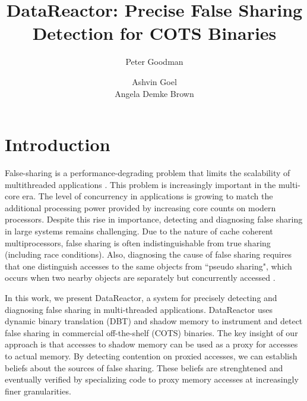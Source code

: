 \documentclass{sig-alternate}
\newcommand{\Toolname}{DataReactor}
\begin{document}
\title{\Large \bf \Toolname: Precise False Sharing Detection for COTS Binaries}
\author{
\alignauthor
Peter Goodman\\
\and
\alignauthor
Ashvin Goel\\
\alignauthor
Angela Demke Brown\\
}
\maketitle


\section{Introduction}\label{sec:intro}


False-sharing is a performance-degrading problem that limits the scalability of multithreaded applications
\cite{ImpactOfFalseSharing}. This problem is increasingly important in the multi-core era. The level of
concurrency in applications is growing to match the additional processing power provided by increasing
core counts on modern processors. Despite this rise in importance, detecting and diagnosing false
sharing in large systems remains challenging. Due to the nature of cache coherent multiprocessors, false
sharing is often indistinguishable from true sharing (including race conditions). Also, diagnosing the cause
of false sharing requires that one distinguish accesses to the same objects from ``pseudo sharing", which
occurs when two nearby objects are separately but concurrently accessed \cite{DegenerateSharingAndFalseCoherence}.

In this work, we present \Toolname{}, a system for precisely detecting and diagnosing false sharing
in multi-threaded applications. \Toolname{} uses dynamic binary translation (DBT) and shadow memory
to instrument and detect false sharing in commercial off-the-shelf (COTS) binaries.  The key insight of our
approach is that accesses to shadow memory can be used as a proxy for accesses to actual memory. By 
detecting contention on proxied accesses, we can establish beliefs about the sources of false sharing. These
beliefs are strenghtened and eventually verified by specializing code to proxy memory accesses at increasingly
finer granularities.
\end{document}
